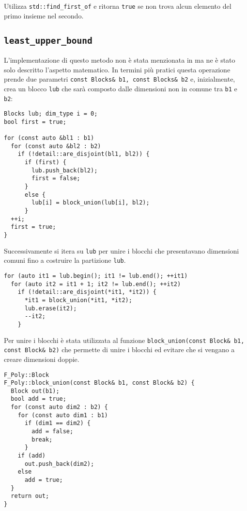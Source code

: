 \documentclass{mimosis}
\theoremstyle{definition}
\begin{document}
Utilizza \texttt{std::find\_first\_of} e ritorna \texttt{true} se non trova alcun elemento del
primo insieme nel secondo.

\subsection{\texttt{least\_upper\_bound}}
\label{sec:org6da2580}
L'implementazione di questo metodo non è stata menzionata in \cite{fastpoly} ma
ne è stato solo descritto l'aspetto matematico. In termini più pratici questa
operazione prende due parametri \texttt{const Blocks\& b1, const Blocks\& b2} e,
inizialmente, crea un blocco \texttt{lub} che sarà composto dalle dimensioni non in
comune tra \texttt{b1} e \texttt{b2}:

\lstset{style=mystyle,language=C++,label= ,caption= ,captionpos=b,numbers=none}
\begin{lstlisting}
Blocks lub; dim_type i = 0;
bool first = true;

for (const auto &bl1 : b1)
  for (const auto &bl2 : b2)
    if (!detail::are_disjoint(bl1, bl2)) {
      if (first) {
        lub.push_back(bl2);
        first = false;
      }
      else {
        lub[i] = block_union(lub[i], bl2);
      }
  ++i;
  first = true;
}
\end{lstlisting}

Successivamente si itera su \texttt{lub} per unire i blocchi che presentavano
dimensioni comuni fino a costruire la partizione \texttt{lub}.

\lstset{style=mystyle,language=C++,label= ,caption= ,captionpos=b,numbers=none}
\begin{lstlisting}
for (auto it1 = lub.begin(); it1 != lub.end(); ++it1)
  for (auto it2 = it1 + 1; it2 != lub.end(); ++it2)
    if (!detail::are_disjoint(*it1, *it2)) {
      *it1 = block_union(*it1, *it2);
      lub.erase(it2);
      --it2;
    }
\end{lstlisting}

Per unire i blocchi è stata utilizzata al funzione \texttt{block\_union(const Block\& b1,
const Block\& b2)} che permette di unire i blocchi ed evitare che si vengano a
creare dimensioni doppie.

\lstset{style=mystyle,language=C++,label= ,caption= ,captionpos=b,numbers=none}
\begin{lstlisting}
F_Poly::Block
F_Poly::block_union(const Block& b1, const Block& b2) {
  Block out(b1);
  bool add = true;
  for (const auto dim2 : b2) {
    for (const auto dim1 : b1)
      if (dim1 == dim2) {
        add = false;
        break;
      }
    if (add)
      out.push_back(dim2);
    else
      add = true;
  }
  return out;
}
\end{lstlisting}
\end{document}
